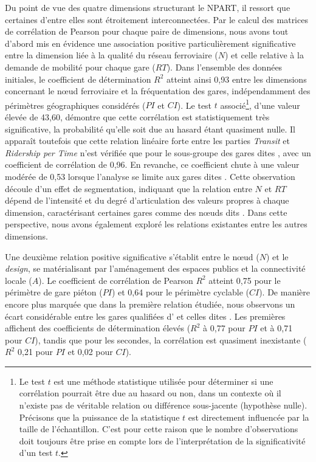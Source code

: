 \begin{refsegment}
Du point de vue des quatre dimensions structurant le \acrshort{NPART}, il ressort que certaines d'entre elles sont étroitement interconnectées. Par le calcul des matrices de corrélation de Pearson pour chaque paire de dimensions, nous avons tout d’abord mis en évidence une association positive particulièrement significative entre la dimension liée à la qualité du réseau ferroviaire (\(N\)) et celle relative à la demande de mobilité pour chaque gare (\(RT\)). Dans l’ensemble des données initiales, le coefficient de détermination \(R^2\) atteint ainsi 0,93 entre les dimensions concernant le nœud ferroviaire et la fréquentation des gares, indépendamment des périmètres géographiques considérés (\(PI\) et \(CI\)). Le test \(t\) associé\footnote{
    Le test \(t\) est une méthode statistique utilisée pour déterminer si une corrélation pourrait être due au hasard ou non, dans un contexte où il n'existe pas de véritable relation ou différence sous-jacente (hypothèse nulle). Précisons que la puissance de la statistique \(t\) est directement influencée par la taille de l'échantillon. C'est pour cette raison que le nombre d'observations doit toujours être prise en compte lors de l'interprétation de la significativité d'un test \(t\).
}, d’une valeur élevée de 43,60, démontre que cette corrélation est statistiquement très significative, la probabilité qu’elle soit due au hasard étant quasiment nulle. Il apparaît toutefois que cette relation linéaire forte entre les parties \textsl{Transit} et \textsl{Ridership per Time} n’est vérifiée que pour le sous-groupe des gares dites , avec un coefficient de corrélation de 0,96. En revanche, ce coefficient chute à une valeur modérée de 0,53 lorsque l’analyse se limite aux gares dites . Cette observation découle d'un effet de segmentation, indiquant que la relation entre \(N\) et \(RT\) dépend de l’intensité et du degré d’articulation des valeurs propres à chaque dimension, caractérisant certaines gares comme des nœuds dits . Dans cette perspective, nous avons également exploré les relations existantes entre les autres dimensions.%

Une deuxième relation positive significative s'établit entre le nœud (\(N\)) et le \textsl{design}, se matérialisant par l’aménagement des espaces publics et la connectivité locale (\(A\)). Le coefficient de corrélation de Pearson \(R^2\) atteint 0,75 pour le périmètre de gare piéton (\(PI\)) et 0,64 pour le périmètre cyclable (\(CI\)). De manière encore plus marquée que dans la première relation étudiée, nous observons un écart considérable entre les gares qualifiées d’ et celles dites . Les premières affichent des coefficients de détermination élevés (\(R^2\) à 0,77 pour \(PI\) et à 0,71 pour \(CI\)), tandis que pour les secondes, la corrélation est quasiment inexistante (\(R^2\) 0,21 pour \(PI\) et 0,02 pour \(CI\)).%


\end{refsegment}
